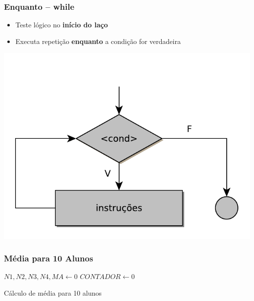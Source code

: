 \documentclass{beamer}
\begin{document}
\begin{frame}
 \frametitle{Enquanto -- while}
 
 \begin{itemize}
    \vfill \item Teste lógico no \textbf{início do laço}
  
    \vfill \item Executa repetição \textbf{enquanto} a condição for verdadeira 
 \end{itemize}
 
 \vfill \center \includegraphics[scale=0.5]{./figures/while-simple.pdf}
 
\end{frame}

\begin{frame}[fragile]
\frametitle{Média para 10 Alunos}
\tiny
\begin{algorithm}[H]
\SetAlFnt{\tiny}
\SetAlCapFnt{\tiny}
\DontPrintSemicolon
{}
\BlankLine
{}
$N1, N2, N3, N4, MA \gets 0$\;
$CONTADOR \gets 0$\;
\BlankLine
{}
\caption{Cálculo de média para 10 alunos}
\label{alg:media-10-alunos}
\end{algorithm}
\end{frame}
\end{document}
